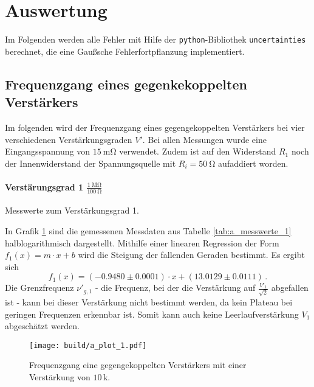 \section{Auswertung}
\label{sec:auswertung}
Im Folgenden werden alle Fehler mit Hilfe der \texttt{python}-Bibliothek
\texttt{uncertainties}\cite{py-uncertainties} berechnet, die eine Gaußsche
Fehlerfortpflanzung implementiert.

\subsection{Frequenzgang eines gegenkekoppelten Verstärkers} %

Im folgenden wird der Frequenzgang eines gegengekoppelten Verstärkers bei vier verschiedenen Verstärkungsgraden $V'$.
Bei allen Messungen wurde eine Eingangsspannung von $\SI{15}{\milli\ohm}$ verwendet.
Zudem ist auf den Widerstand $R_1$ noch der Innenwiderstand der Spannungsquelle mit $R_i = \SI{50}{\ohm}$ aufaddiert worden.

\paragraph{Verstärungsgrad 1 $\frac{\SI{1}{\mega\ohm}}{\SI{100}{\ohm}}$}

\begin{table}
\centering
\caption{Messwerte zum Verstärkungsgrad 1.}
    \label{tab:a_messwerte_1}
    
\end{table}

In Grafik \ref{fig:a_plot_1} sind die gemessenen Messdaten aus Tabelle \ref{tab:a_messwerte_1} halblogarithmisch dargestellt.
Mithilfe einer linearen Regression der Form $f_1(x)=m \cdot x + b$ wird die Steigung der fallenden Geraden bestimmt.
Es ergibt sich
\begin{equation*}
	f_1(x) = (-0.9480\pm0.0001) \cdot x + (13.0129\pm0.0111)\,.
\end{equation*}
Die Grenzfrequenz $\nu'_{g,1}$ - die Frequenz, bei der die Verstärkung auf $\frac{V'_1}{\sqrt{2}}$ abgefallen ist - kann bei dieser Verstärkung nicht bestimmt werden, da kein Plateau bei geringen Frequenzen erkennbar ist.
Somit kann auch keine Leerlaufverstärkung $V_1$ abgeschätzt werden.

\begin{figure}[h!]
    \centering
    \texttt{[image: build/a\_plot\_1.pdf]}
    \caption{Frequenzgang eine gegengekoppelten Verstärkers mit einer Verstärkung von $10\,\mathrm{k}$.}
    \label{fig:a_plot_1}
\end{figure}

